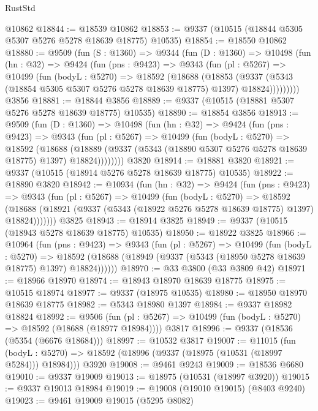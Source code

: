 \begin{lexlean}{RustStd}
\begin{coremodule}
    @10862
@18844 := @18539 @10862
@18853 := @9337 (@10515 (@18844 @5305 @5307 @5276 @5278 @18639 @18775) @10535)
@18854 := @18550 @10862
@18880 := @9509
    (fun (S : @1360) =>
    @9344
      (fun (D : @1360) =>
      @10498
        (fun (hn : @32) =>
        @9424
          (fun (pns : @9423) =>
          @9343
            (fun (pl : @5267) =>
            @10499
              (fun (bodyL : @5270) =>
              @18592
                (@18688
                  (@18853
                    (@9337
                      (@5343 (@18854 @5305 @5307 @5276 @5278 @18639 @18775) @1397)
                      @18824)))))))))
    @3856
@18881 := @18844 @3856
@18889 := @9337 (@10515 (@18881 @5307 @5276 @5278 @18639 @18775) @10535)
@18890 := @18854 @3856
@18913 := @9509
    (fun (D : @1360) =>
    @10498
      (fun (hn : @32) =>
      @9424
        (fun (pns : @9423) =>
        @9343
          (fun (pl : @5267) =>
          @10499
            (fun (bodyL : @5270) =>
            @18592
              (@18688
                (@18889 (@9337 (@5343 (@18890 @5307 @5276 @5278 @18639 @18775) @1397) @18824))))))))
    @3820
@18914 := @18881 @3820
@18921 := @9337 (@10515 (@18914 @5276 @5278 @18639 @18775) @10535)
@18922 := @18890 @3820
@18942 := @10934
    (fun (hn : @32) =>
    @9424
      (fun (pns : @9423) =>
      @9343
        (fun (pl : @5267) =>
        @10499
          (fun (bodyL : @5270) =>
          @18592
            (@18688 (@18921 (@9337 (@5343 (@18922 @5276 @5278 @18639 @18775) @1397) @18824)))))))
    @3825
@18943 := @18914 @3825
@18949 := @9337 (@10515 (@18943 @5278 @18639 @18775) @10535)
@18950 := @18922 @3825
@18966 := @10964
    (fun (pns : @9423) =>
    @9343
      (fun (pl : @5267) =>
      @10499
        (fun (bodyL : @5270) =>
        @18592 (@18688 (@18949 (@9337 (@5343 (@18950 @5278 @18639 @18775) @1397) @18824))))))
@18970 := @33 @3800 (@33 @3809 @42)
@18971 := @18966 @18970
@18974 := @18943 @18970 @18639 @18775
@18975 := @10515 @18974
@18977 := @9337 (@18975 @10535)
@18980 := @18950 @18970 @18639 @18775
@18982 := @5343 @18980 @1397
@18984 := @9337 @18982 @18824
@18992 := @9506
    (fun (pl : @5267) => @10499 (fun (bodyL : @5270) => @18592 (@18688 (@18977 @18984))))
    @3817
@18996 := @9337 (@18536 (@5354 (@6676 @18684)))
@18997 := @10532 @3817
@19007 := @11015
    (fun (bodyL : @5270) => @18592 (@18996 (@9337 (@18975 (@10531 (@18997 @5284))) @18984)))
    @3920
@19008 := @9461 @9243
@19009 := @18536 @6680
@19010 := @9337 @19009
@19013 := @18975 (@10531 (@18997 @3920))
@19015 := @9337 @19013 @18984
@19019 := @19008 (@19010 @19015) (@8403 @9240)
@19023 := @9461 @19009 @19015 (@5295 @8082)

\end{coremodule}
\end{lexlean}
